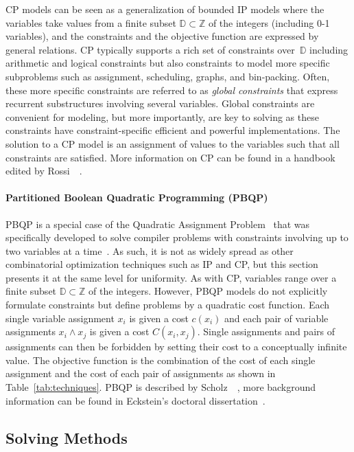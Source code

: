 \documentclass[acmsmall,authorversion,nonacm]{acmart}
\newcommand{\ZZ}{\ensuremath{\mathbb Z}}
\newcommand{\finiteDomainNumbers}{\ensuremath{\mathbb D}}
\begin{document}
CP models can be seen as a generalization of bounded IP models where
the variables take values from a finite subset
$\finiteDomainNumbers\subset\ZZ$ of the integers (including 0-1
variables), and the constraints and the objective function are
expressed by general relations.
CP typically supports a rich set of constraints
over~$\finiteDomainNumbers$ including arithmetic and logical
constraints but also constraints to model more specific subproblems
such as assignment, scheduling, graphs, and bin-packing.  Often, these
more specific constraints are referred to as \emph{global constraints}
that express recurrent substructures involving several
variables. Global constraints are convenient for modeling, but more
importantly, are key to solving as these constraints have
constraint-specific efficient and powerful implementations.
The solution to a CP model is an assignment of values to the variables
such that all constraints are satisfied.
More information on CP can be found in a handbook edited by
Rossi~\etal{}~\cite{CPH:2006}.

\paragraph{Partitioned Boolean Quadratic Programming (PBQP)}

PBQP is a special case of the Quadratic Assignment
Problem~\cite{Koopmans1957} that was specifically developed to solve
compiler problems with constraints involving up to two variables at a
time~\cite{Scholz2002,Eckstein2003,Eckstein2003b}.
As such, it is not as widely spread as other combinatorial
optimization techniques such as IP and CP, but this section presents
it at the same level for uniformity.
As with CP, variables range over a finite subset
$\finiteDomainNumbers\subset\ZZ$ of the integers.
However, PBQP models do not explicitly formulate constraints but
define problems by a quadratic cost function.
Each single variable assignment $x_i$ is given a cost $c(x_i)$ and
each pair of variable assignments $x_i \land x_j$ is given a cost
$C(x_i, x_j)$.
Single assignments and pairs of assignments can then be forbidden by
setting their cost to a conceptually infinite value.
The objective function is the combination of the cost of each single
assignment and the cost of each pair of assignments as shown in
Table~\ref{tab:techniques}.
PBQP is described by Scholz~\etal{}~\cite{Scholz2002,Hames2006}, more
background information can be found in Eckstein's doctoral
dissertation~\cite{Eckstein2003c}.

\subsection{Solving Methods}\label{sec:solving}
\end{document}
